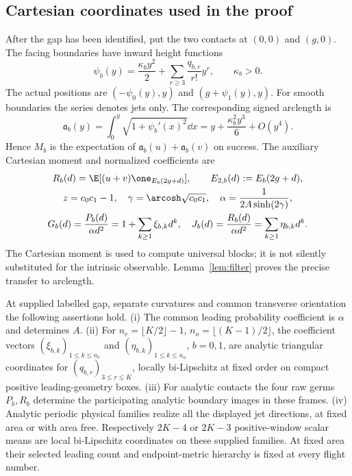 \subsection{Cartesian coordinates used in the proof}
After the gap has been identified, put the two contacts at $(0,0)$ and
$(g,0)$. The facing boundaries have inward height functions
\begin{equation}\label{eq:graphs}
 \psi_b(y)=\frac{\kappa_by^2}{2}
       +\sum_{r\ge3}\frac{q_{b,r}}{r!}y^r,\qquad \kappa_b>0.
\end{equation}
The actual positions are $(-\psi_0(y),y)$ and
$(g+\psi_1(y),y)$. For smooth boundaries the series denotes jets only.
The corresponding signed arclength is
\begin{equation}\label{eq:arcmap}
 \mathfrak a_b(y)=\int_0^y\sqrt{1+\psi_b'(x)^2}\dd x
       =y+\frac{\kappa_b^2y^3}{6}+O(y^4).
\end{equation}
Hence $M_b$ is the expectation of $\mathfrak a_b(u)+\mathfrak a_b(v)$ on success.
The auxiliary Cartesian moment and normalized coefficients are
\begin{gather}
 R_b(d)=\E[(u+v)\one_{E_b(2g+d)}],\qquad
 E_{2,b}(d):=E_b(2g+d),\label{eq:rawdata}\\
 z=c_0c_1-1,\quad \gamma=\arcosh\sqrt{c_0c_1},\quad
 \alpha=\frac1{2A\sinh(2\gamma)},\label{eq:leading}\\
 G_b(d)=\frac{P_b(d)}{\alpha d^2}=1+\sum_{k\ge1}\xi_{b,k}d^k,
 \quad J_b(d)=\frac{R_b(d)}{\alpha d^2}=\sum_{k\ge1}\eta_{b,k}d^k.
 \label{eq:coefficients}
\end{gather}
The Cartesian moment is used to compute universal blocks; it is not
silently substituted for the intrinsic observable. Lemma~\ref{lem:filter}
proves the precise transfer to arclength.

\begin{theorem}\label{thm:main}
At supplied labelled gap, separate curvatures and common transverse
orientation the following assertions hold.
\textup{(i)} The common leading probability coefficient is $\alpha$ and
determines $A$. \textup{(ii)} For
$n_e=\lfloor K/2\rfloor-1$, $n_o=\lfloor(K-1)/2\rfloor$,
the coefficient vectors $(\xi_{b,k})_{1\le k\le n_e}$ and
$(\eta_{b,k})_{1\le k\le n_o}$, $b=0,1$, are analytic triangular
coordinates for $(q_{b,r})_{3\le r\le K}$, locally bi-Lipschitz at
fixed order on compact positive leading-geometry boxes.
\textup{(iii)} For analytic contacts the four raw germs $P_b,R_b$
determine the participating analytic boundary images in these frames.
\textup{(iv)} Analytic periodic physical families realize all the displayed
jet directions, at fixed area or with area free. Respectively $2K-4$ or
$2K-3$ positive-window scalar means are local bi-Lipschitz coordinates
on these supplied families. At fixed area their selected leading
count and endpoint-metric hierarchy is fixed at every flight number.
\end{theorem}

